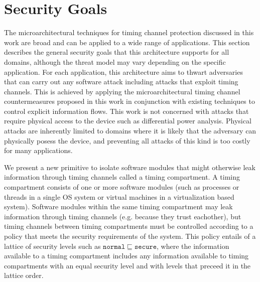 \section{Security Goals}
    The microarchitectural techniques for timing channel protection discussed 
    in this work are broad and can be applied to a wide range of applications.  
    This section describes the general security goals that this architecture 
    supports for all domains, although the threat model may vary depending on 
    the specific application. For each application, this architecture aims to 
    thwart adversaries that can carry out any software attack including attacks
    that exploit timing channels. This is achieved by applying the 
    microarchitectural timing channel countermeasures proposed in this work in 
    conjunction with existing techniques to control explicit information flows. 
    This work is not concerned with attacks that require physical access to the 
    device such as differential power analysis. Physical attacks are inherently 
    limited to domains where it is likely that the adversary can physically 
    posess the device, and preventing all attacks of this kind is too costly 
    for many applications.

    We present a new primitive to isolate software modules that might otherwise 
    leak information through timing channels called a timing compartment.  A 
    timing compartment consists of one or more software modules (such as 
    processes or threads in a single OS system or virtual machines in a 
    virtualization based system).  Software modules within the same timing 
    compartment may leak information through timing channels (e.g. because they 
    trust eachother), but timing channels between timing compartments must be 
    controlled according to a policy that meets the security requirements of 
    the system. This policy entails of a lattice of security levels such as 
    $\mathtt{normal} \sqsubseteq \mathtt{secure}$, where the information 
    available to a timing compartment includes any information available to 
    timing compartments with an equal security level and with levels that 
    preceed it in the lattice order. 


